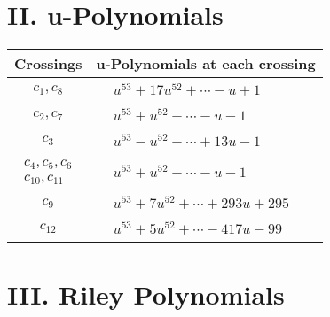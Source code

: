 \documentclass[1p]{elsarticle_modified}
\theoremstyle{definition}
\begin{document}
\newpage\renewcommand{\arraystretch}{1}
\centering \section*{ II. u-Polynomials}
\begin{tabular}{m{50pt}|m{274pt}}
Crossings & \hspace{64pt}u-Polynomials at each crossing \\
\hline $$\begin{aligned}c_{1},c_{8}\end{aligned}$$&$\begin{aligned}
&u^{53}+17 u^{52}+\cdots- u+1
\end{aligned}$\\
\hline $$\begin{aligned}c_{2},c_{7}\end{aligned}$$&$\begin{aligned}
&u^{53}+u^{52}+\cdots- u-1
\end{aligned}$\\
\hline $$\begin{aligned}c_{3}\end{aligned}$$&$\begin{aligned}
&u^{53}- u^{52}+\cdots+13 u-1
\end{aligned}$\\
\hline $$\begin{aligned}c_{4},c_{5},c_{6}\\c_{10},c_{11}\end{aligned}$$&$\begin{aligned}
&u^{53}+u^{52}+\cdots- u-1
\end{aligned}$\\
\hline $$\begin{aligned}c_{9}\end{aligned}$$&$\begin{aligned}
&u^{53}+7 u^{52}+\cdots+293 u+295
\end{aligned}$\\
\hline $$\begin{aligned}c_{12}\end{aligned}$$&$\begin{aligned}
&u^{53}+5 u^{52}+\cdots-417 u-99
\end{aligned}$\\
\hline
\end{tabular}\newpage\renewcommand{\arraystretch}{1}
\centering \section*{ III. Riley Polynomials}
\end{document}
